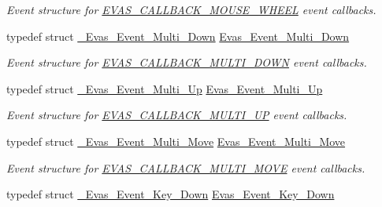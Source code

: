 \begin{DoxyCompactItemize}
\begin{DoxyCompactList}\small\item\em Event structure for \hyperlink{Evas_8h_a99e208e463a20499aabe6faac8a8cb8aa39d739f473db520ec4dfe0776ed43be4}{EVAS\_\-CALLBACK\_\-MOUSE\_\-WHEEL} event callbacks. \item\end{DoxyCompactList}\item 
typedef struct \hyperlink{struct__Evas__Event__Multi__Down}{\_\-Evas\_\-Event\_\-Multi\_\-Down} \hyperlink{Evas_8h_a0436550ffcc1e2eab730ef3c493b8c40}{Evas\_\-Event\_\-Multi\_\-Down}\label{Evas_8h_a0436550ffcc1e2eab730ef3c493b8c40}

\begin{DoxyCompactList}\small\item\em Event structure for \hyperlink{Evas_8h_a99e208e463a20499aabe6faac8a8cb8aab5bb0de31eaeed655255e71ffe518b80}{EVAS\_\-CALLBACK\_\-MULTI\_\-DOWN} event callbacks. \item\end{DoxyCompactList}\item 
typedef struct \hyperlink{struct__Evas__Event__Multi__Up}{\_\-Evas\_\-Event\_\-Multi\_\-Up} \hyperlink{Evas_8h_a0f4d63b8673ee370e41e2c0bdc374212}{Evas\_\-Event\_\-Multi\_\-Up}\label{Evas_8h_a0f4d63b8673ee370e41e2c0bdc374212}

\begin{DoxyCompactList}\small\item\em Event structure for \hyperlink{Evas_8h_a99e208e463a20499aabe6faac8a8cb8aa4328f52cfb700b5c705edf7173afdd94}{EVAS\_\-CALLBACK\_\-MULTI\_\-UP} event callbacks. \item\end{DoxyCompactList}\item 
typedef struct \hyperlink{struct__Evas__Event__Multi__Move}{\_\-Evas\_\-Event\_\-Multi\_\-Move} \hyperlink{Evas_8h_a8658f1e1a6801e219547b05e8728ebd2}{Evas\_\-Event\_\-Multi\_\-Move}\label{Evas_8h_a8658f1e1a6801e219547b05e8728ebd2}

\begin{DoxyCompactList}\small\item\em Event structure for \hyperlink{Evas_8h_a99e208e463a20499aabe6faac8a8cb8aa6d0ade7e69dc62f728fa2e29168e923f}{EVAS\_\-CALLBACK\_\-MULTI\_\-MOVE} event callbacks. \item\end{DoxyCompactList}\item 
typedef struct \hyperlink{struct__Evas__Event__Key__Down}{\_\-Evas\_\-Event\_\-Key\_\-Down} \hyperlink{Evas_8h_a9a1bfd297b751119977f3c14c0004612}{Evas\_\-Event\_\-Key\_\-Down}\label{Evas_8h_a9a1bfd297b751119977f3c14c0004612}


\end{DoxyCompactItemize}

